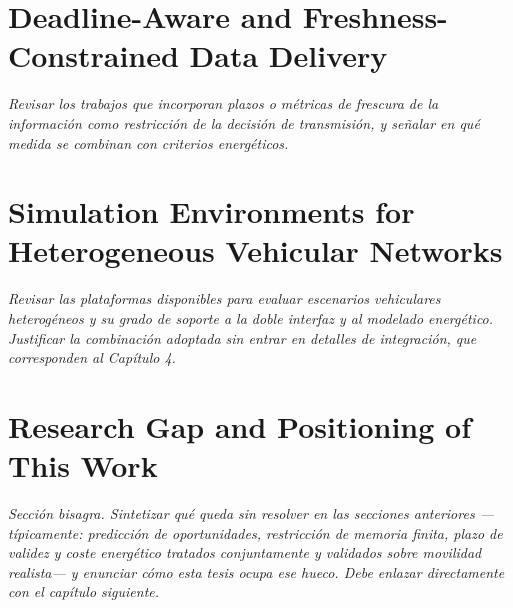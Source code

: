 \section{Deadline-Aware and Freshness-Constrained Data Delivery}
\emph{Revisar los trabajos que incorporan plazos o métricas de frescura de la
información como restricción de la decisión de transmisión, y señalar en qué
medida se combinan con criterios energéticos.}

\section{Simulation Environments for Heterogeneous Vehicular Networks}
\emph{Revisar las plataformas disponibles para evaluar escenarios vehiculares
heterogéneos y su grado de soporte a la doble interfaz y al modelado energético.
Justificar la combinación adoptada sin entrar en detalles de integración, que
corresponden al Capítulo 4.}

\section{Research Gap and Positioning of This Work}
\emph{Sección bisagra. Sintetizar qué queda sin resolver en las secciones
anteriores —típicamente: predicción de oportunidades, restricción de memoria
finita, plazo de validez y coste energético tratados conjuntamente y validados
sobre movilidad realista— y enunciar cómo esta tesis ocupa ese hueco. Debe
enlazar directamente con el capítulo siguiente.}
